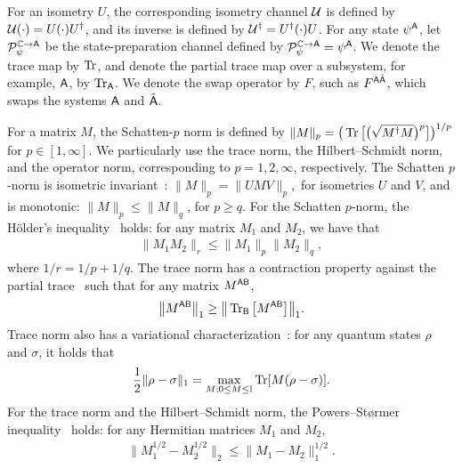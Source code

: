 For an isometry $U$, the corresponding isometry channel ${\mathcal{U}}$ is defined by ${\mathcal{U}}(\cdot) = U(\cdot)U^\dag$, and its inverse is defined by ${\mathcal{U}}^\dag = U^\dag(\cdot)U$.
For any state $\psi^{\mathsf{A}}$, let ${\mathcal{P}}_{\psi}^{\mathbb{C}\rightarrow{\mathsf{A}}}$ be the state-preparation channel defined by ${\mathcal{P}}_{\psi}^{\mathbb{C}\rightarrow{\mathsf{A}}} = \psi^{\mathsf{A}}$.
We denote the trace map by $\operatorname{Tr}$, and denote the partial trace map over a subsystem, for example, ${\mathsf{A}}$, by $\operatorname{Tr}_{\mathsf{A}}$.
We denote the swap operator by $F$, such as $F^{{\mathsf{A}}\hat{{\mathsf{A}}}}$, which swaps the systems ${\mathsf{A}}$ and $\hat{{\mathsf{A}}}$.







For a matrix $M$, the Schatten-$p$ norm is defined by $\| M \|_p = \big(\operatorname{Tr}\big[\big(\sqrt{M^\dag M}\big)^p\big]\big)^{1/p}$ for $p\in[1, \infty]$. We particularly use the trace norm, the Hilbert--Schmidt norm, and the operator norm, corresponding to $p=1, 2, \infty$, respectively.
The Schatten $p$-norm is isometric invariant~\cite{wilde2013QItheory, bhatia2013matrix, watrous2018TheoryQI}: $\|M\|_p = \|UMV\|_p,$ for isometries $U$ and $V$, and is monotonic: $\|M\|_p \leq \|M\|_q$, for $p \geq q$.
For the Schatten $p$-norm, the H\"{o}lder's inequality~\cite{Rogers1888extension, Holder1889inequality} holds: for any matrix $M_1$ and $M_2$, we have that
\begin{align}
\label{eq:Holder ineq}
    \|M_1M_2\|_r \leq \|M_1\|_p\|M_2\|_q,
\end{align}
where $1/r = 1/p + 1/q$.
The trace norm has a contraction property against the partial trace~\cite{rastegin2012NormPartialTrace, watrous2018TheoryQI} such that for any matrix $M^{{\mathsf{A}}{\mathsf{B}}}$,
\begin{equation}
\label{eq:contraction trace norm}
    \big\|M^{{\mathsf{A}}{\mathsf{B}}}\big\|_1 \geq \big\|\operatorname{Tr}_{{\mathsf{B}}}\big[M^{{\mathsf{A}}{\mathsf{B}}}\big]\big\|_1.
\end{equation}
Trace norm also has a variational characterization~\cite{nielsen2010quantum, wilde2013QItheory, watrous2018TheoryQI}: for any quantum states $\rho$ and $\sigma$, it holds that
\begin{align}
\label{eq:trace distance variational}
    \frac{1}{2}\|\rho - \sigma\|_1 = \max_{M; 0 \leq M \leq \mathbb{I}}\operatorname{Tr}[M(\rho - \sigma)].
\end{align}
For the trace norm and the Hilbert--Schmidt norm, the Powers--St\o rmer inequality~\cite{powers1970free, kittaneh1987inequalities, bhatia2013matrix} holds: for any Hermitian matrices $M_1$ and $M_2$, 
\begin{align}
\label{eq:powers stormer ineq}
    \big\| M_1^{1/2} - M_2^{1/2} \big\|_2 \leq \big\|M_1 - M_2 \big\|_1^{1/2}.
\end{align}




